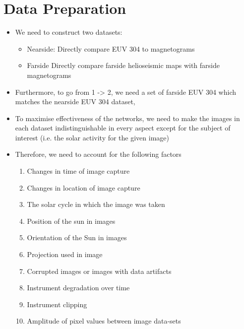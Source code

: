 \documentclass[11pt,a4paper,onecolumn]{report}
\begin{document}


%
%
%
%
\chapter{Data Preparation}
%
%
%
%




\begin{itemize}

  \item We need to construct two datasets:
  
  \begin{itemize}
    \item Nearside: Directly compare EUV 304 to magnetograms
    \item Farside Directly compare farside helioseismic maps with farside magnetograms
  \end{itemize}
  
  \item Furthermore, to go from 1 -> 2,  we need a set of farside EUV 304 which
  matches the nearside EUV 304 dataset,

  \item To maximise effectiveness of the networks, we need to make the images in
  each dataset indistinguishable in every aspect except for the subject of
  interest (i.e. the solar activity for the given image)

  
  \item Therefore, we need to account for the following factors
  
  \begin{enumerate}[i]
    \item Changes in time of image capture
    \item Changes in location of image capture
    \item The solar cycle in which the image was taken
    \item Position of the sun in images
    \item Orientation of the Sun in images
    \item Projection used in image
    \item Corrupted images or images with data artifacts
    \item Instrument degradation over time
    \item Instrument clipping
    \item Amplitude of pixel values between image data-sets
  \end{enumerate}




\end{itemize}
\end{document}
